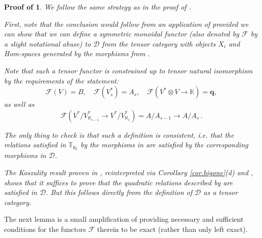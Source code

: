 \documentclass[11pt]{article}
\theoremstyle{plain}
\theoremstyle{nonumberplain}
\theoremstyle{plain}
\theoremstyle{nonumberplain}
\newtheorem{proof-of-univ}{Proof of \Cref{th.univ}}
\newcommand\bK{\mathbb K}
\newcommand\bT{\mathbb T}
\newcommand\cD{\mathcal D}
\begin{document}
\begin{proof-of-univ}
  We follow the same strategy as in the proof of \cite[Theorem
  3.22]{us2}.

  First, note that the conclusion would follow from an application of
  \cite[Theorem 2.22]{us2} provided we can show that we can define a
  symmetric monoidal functor (also denoted by $\mathcal{F}$ by a slight
  notational abuse) to $\cD$ from the tensor category with objects
  $X_i$ and Hom-spaces generated by the morphisms from .

  Note that such a tensor functor is constrained up to tensor natural
  isomorphism by the requirements of the statement:
  \begin{equation*}
    \mathcal{F}(V)=B,\quad \mathcal{F}\left(V^*_s\right) = A_s,\quad \mathcal{F}(V^*\otimes V\to \bK) = \mathbf{q}, 
  \end{equation*}
  as well as
  \begin{equation*}
    \mathcal{F}(V^*/V^*_{\aleph_{s-1}}\to V^*/V^*_{\aleph_{s}}) = A/A_{s-1}\to A/A_{s}\,.
  \end{equation*}

  The only thing to check is that such a definition is consistent,
  i.e. that the relations satisfied in $\bT_{\aleph_t}$ by the
  morphisms in  are satisfied by the corresponding
  morphisms in $\cD$.

  The Koszulity result proven in , reinterpreted via
  Corollary \ref{cor.bigone}(d) and , shows that it suffices to prove
  that the quadratic relations described by  are
  satisfied in $\mathcal{D}$.  But this follows directly from the definition of $\mathcal{D}$ as a tensor category.
\end{proof-of-univ}


The next lemma is a small amplification of 
providing necessary and sufficient conditions for the functors $\mathcal{F}$
therein to be exact (rather than only left exact).
\end{document}
